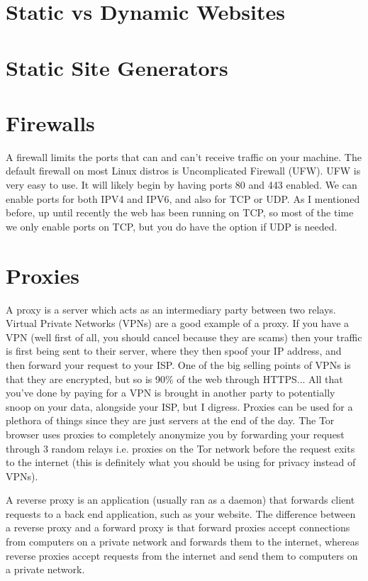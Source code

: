 \documentclass{article}
\begin{document}
\section{Static vs Dynamic Websites}

\section{Static Site Generators}

\section{Firewalls}

A firewall limits the ports that can and can't receive traffic on your machine. The default firewall on most 
Linux distros is Uncomplicated Firewall (UFW). UFW is very easy to use. It will likely begin by having ports 
80 and 443 enabled. We can enable ports for both IPV4 and IPV6, and also for TCP or UDP. As I mentioned before,
up until recently the web has been running on TCP, so most of the time we only enable ports on TCP, but you do 
have the option if UDP is needed. 

\section{Proxies}

A proxy is a server which acts as an intermediary party between two relays. Virtual Private Networks (VPNs) are 
a good example of a proxy. If you have a VPN (well first of all, you should cancel because they are scams) 
then your traffic is first being sent to their server, where they then spoof your IP address, and then forward 
your request to your ISP. One of the big selling points of VPNs is that they are encrypted, but so is 90\% 
of the web through HTTPS... All that you've done by paying for a VPN is brought in another party to potentially 
snoop on your data, alongside your ISP, but I digress. Proxies can be used for a plethora of things since they 
are just servers at the end of the day. The Tor browser uses proxies to completely anonymize you by forwarding 
your request through 3 random relays i.e. proxies on the Tor network before the request exits to the internet 
(this is definitely what you should be using for privacy instead of VPNs). 

A reverse proxy is an application (usually ran as a daemon) that forwards client requests to a back end 
application, such as your website. The difference between a reverse proxy and a forward proxy is that forward 
proxies accept connections from computers on a private network and forwards them to the internet, whereas 
reverse proxies accept requests from the internet and send them to computers on a private network. 
\end{document}
